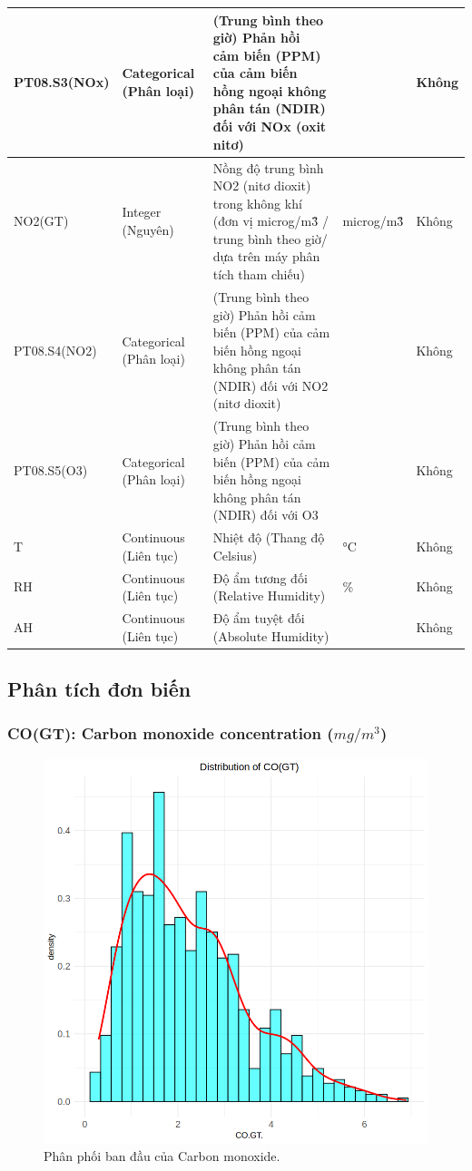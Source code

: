 \begin{longtable}{|l|l|p{4cm}|l|l|}
    PT08.S3(NOx) & Categorical (Phân loại) & (Trung bình theo giờ) Phản hồi cảm biến (PPM) của cảm biến hồng ngoại không phân tán (NDIR) đối với NOx (oxit nitơ) & ~ & Không \\ \hline
    NO2(GT) & Integer (Nguyên) & Nồng độ trung bình NO2 (nitơ dioxit) trong không khí (đơn vị microg/m\^3 / trung bình theo giờ/ dựa trên máy phân tích tham chiếu) & microg/m\^3 & Không \\ \hline
    PT08.S4(NO2) & Categorical (Phân loại) & (Trung bình theo giờ) Phản hồi cảm biến (PPM) của cảm biến hồng ngoại không phân tán (NDIR) đối với NO2 (nitơ dioxit) & ~ & Không \\ \hline
    PT08.S5(O3) & Categorical (Phân loại) & (Trung bình theo giờ) Phản hồi cảm biến (PPM) của cảm biến hồng ngoại không phân tán (NDIR) đối với O3 & ~ & Không \\ \hline
    T & Continuous (Liên tục) & Nhiệt độ (Thang độ Celsius) & °C & Không \\ \hline
    RH & Continuous (Liên tục) & Độ ẩm tương đối (Relative Humidity) & \% & Không \\ \hline
    AH & Continuous (Liên tục) & Độ ẩm tuyệt đối (Absolute Humidity) & ~ & Không \\ \hline
\end{longtable}

\subsection{Phân tích đơn biến}

\subsubsection{CO(GT): Carbon monoxide concentration ($mg/m^3$)}

\begin{figure}[H]
    \centering
    \includegraphics[width=0.75\columnwidth]{air_figures/CO(GT)_original_distribution.png}
    \caption{Phân phối ban đầu của Carbon monoxide.}
    \label{fig:co_original_distribution}
\end{figure}

